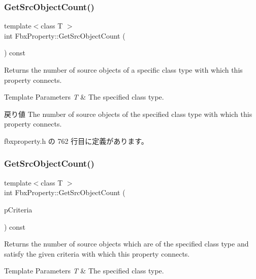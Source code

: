 \subsubsection{\texorpdfstring{Get\+Src\+Object\+Count()}{GetSrcObjectCount()}\hspace{0.1cm}{\footnotesize\ttfamily [3/4]}}
{\footnotesize\ttfamily template$<$class T $>$ \\
int Fbx\+Property\+::\+Get\+Src\+Object\+Count (\begin{DoxyParamCaption}{ }\end{DoxyParamCaption}) const\hspace{0.3cm}{\ttfamily [inline]}}

Returns the number of source objects of a specific class type with which this property connects. 
\begin{DoxyTemplParams}{Template Parameters}
{\em T} & The specified class type. \\
\hline
\end{DoxyTemplParams}
\begin{DoxyReturn}{戻り値}
The number of source objects of the specified class type with which this property connects. 
\end{DoxyReturn}


 fbxproperty.\+h の 762 行目に定義があります。

\mbox{\label{class_fbx_property_a4a79c28a713cafebad7254bd68b05a2f}} 
\subsubsection{\texorpdfstring{Get\+Src\+Object\+Count()}{GetSrcObjectCount()}\hspace{0.1cm}{\footnotesize\ttfamily [4/4]}}
{\footnotesize\ttfamily template$<$class T $>$ \\
int Fbx\+Property\+::\+Get\+Src\+Object\+Count (\begin{DoxyParamCaption}\item[{const \hyperlink{class_fbx_criteria}{Fbx\+Criteria} \&}]{p\+Criteria }\end{DoxyParamCaption}) const\hspace{0.3cm}{\ttfamily [inline]}}

Returns the number of source objects which are of the specified class type and satisfy the given criteria with which this property connects. 
\begin{DoxyTemplParams}{Template Parameters}
{\em T} & The specified class type. \\
\hline
\end{DoxyTemplParams}

